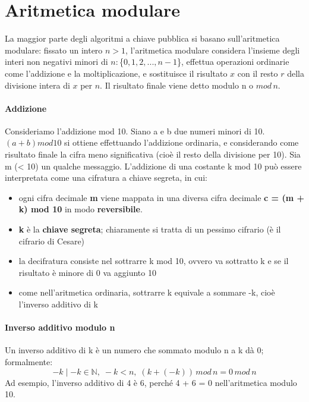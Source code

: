 \section{Aritmetica modulare}
La maggior parte degli algoritmi a chiave pubblica si basano sull'aritmetica modulare: fissato un intero $ n>1 $, l'aritmetica modulare considera l'insieme degli interi non negativi minori di
$n: $\{$0, 1, 2,..., n-1$\}, effettua operazioni ordinarie come l'addizione e la moltiplicazione, e sostituisce il risultato $x$ con il resto $r$ della divisione intera di $x$ per $n$. Il risultato finale viene detto modulo n o $mod \, n$. \\

\paragraph{Addizione}
Consideriamo l'addizione mod 10. Siano a e b due numeri minori di 10. $(a + b)mod10$ si ottiene effettuando l'addizione ordinaria, e considerando come risultato finale la cifra meno significativa (cioè il resto della divisione per 10). 
\newline \newline
Sia m (< 10) un qualche messaggio. L'addizione di una costante k mod 10 può essere interpretata come una cifratura a chiave segreta, in cui:
\begin{itemize}
\item ogni cifra decimale \textbf{m} viene mappata in una diversa cifra decimale \textbf{c = (m + k) mod 10} in modo \textbf{reversibile}.
\item \textbf{k} è la \textbf{chiave segreta}; chiaramente si tratta di un pessimo cifrario (è il cifrario di Cesare)
\item la decifratura consiste nel sottrarre k mod 10, ovvero va sottratto k e se il risultato è minore di 0 va aggiunto 10
\item come nell'aritmetica ordinaria, sottrarre k equivale a sommare -k, cioè l'inverso additivo di k
\end{itemize}

\paragraph{Inverso additivo modulo n}
Un inverso additivo di k è un numero che sommato modulo n a k dà 0; formalmente: 
\begin{equation}
-k \mid -k \in \mathbb{N},\; -k < n,\; (k + (-k)) \, mod \, n = 0 \, mod \, n
\end{equation}
Ad esempio, l'inverso additivo di 4 è 6, perché 4 + 6 = 0 nell'aritmetica modulo 10.

